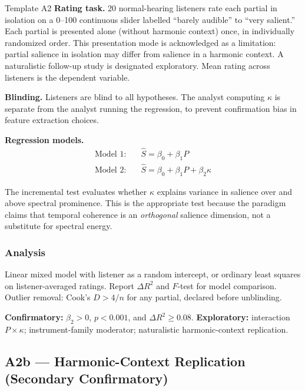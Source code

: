 \documentclass[11pt, a4paper]{article}
\begin{document}
\begin{predbox}{Template A2}
\textbf{Rating task.}
20 normal-hearing listeners rate each partial in isolation on a 0–100 continuous
slider labelled ``barely audible'' to ``very salient.''  Each partial is presented
alone (without harmonic context) once, in individually randomized order.  This
presentation mode is acknowledged as a limitation: partial salience in isolation
may differ from salience in a harmonic context.  A naturalistic follow-up study
is designated exploratory.  Mean rating across listeners is the dependent variable.

\textbf{Blinding.}
Listeners are blind to all hypotheses.  The analyst computing $\kappa$ is
separate from the analyst running the regression, to prevent confirmation bias
in feature extraction choices.

\textbf{Regression models.}
\begin{align}
  \text{Model 1:} \quad & \hat{S} = \beta_0 + \beta_1 P \\[4pt]
  \text{Model 2:} \quad & \hat{S} = \beta_0 + \beta_1 P + \beta_2 \kappa
\end{align}

The incremental test evaluates whether $\kappa$ explains variance in salience
over and above spectral prominence.  This is the appropriate test because the
paradigm claims that temporal coherence is an \emph{orthogonal} salience
dimension, not a substitute for spectral energy.

\subsubsection{Analysis}

Linear mixed model with listener as a random intercept, or ordinary least squares
on listener-averaged ratings.  Report $\Delta R^2$ and $F$-test for model
comparison.  Outlier removal: Cook's $D > 4/n$ for any partial, declared before
unblinding.

\textbf{Confirmatory:} $\hat{\beta}_2 > 0$, $p < 0.001$, and $\Delta R^2 \geq 0.08$.
\textbf{Exploratory:} interaction $P \times \kappa$; instrument-family moderator;
naturalistic harmonic-context replication.

\end{predbox}

\subsection{A2b — Harmonic-Context Replication (Secondary Confirmatory)}
\end{document}
